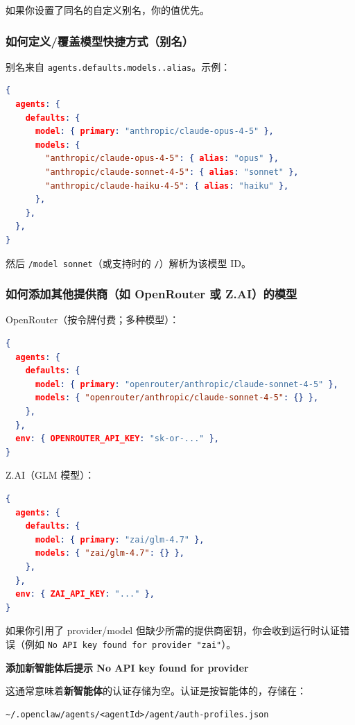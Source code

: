 如果你设置了同名的自定义别名，你的值优先。

\subsubsection{如何定义/覆盖模型快捷方式（别名）}


别名来自 \texttt{agents.defaults.models..alias}。示例：

\begin{lstlisting}[language=json]
{
  agents: {
    defaults: {
      model: { primary: "anthropic/claude-opus-4-5" },
      models: {
        "anthropic/claude-opus-4-5": { alias: "opus" },
        "anthropic/claude-sonnet-4-5": { alias: "sonnet" },
        "anthropic/claude-haiku-4-5": { alias: "haiku" },
      },
    },
  },
}
\end{lstlisting}


然后 \texttt{/model sonnet}（或支持时的 \texttt{/}）解析为该模型 ID。

\subsubsection{如何添加其他提供商（如 OpenRouter 或 Z.AI）的模型}


OpenRouter（按令牌付费；多种模型）：

\begin{lstlisting}[language=json]
{
  agents: {
    defaults: {
      model: { primary: "openrouter/anthropic/claude-sonnet-4-5" },
      models: { "openrouter/anthropic/claude-sonnet-4-5": {} },
    },
  },
  env: { OPENROUTER_API_KEY: "sk-or-..." },
}
\end{lstlisting}


Z.AI（GLM 模型）：

\begin{lstlisting}[language=json]
{
  agents: {
    defaults: {
      model: { primary: "zai/glm-4.7" },
      models: { "zai/glm-4.7": {} },
    },
  },
  env: { ZAI_API_KEY: "..." },
}
\end{lstlisting}


如果你引用了 provider/model 但缺少所需的提供商密钥，你会收到运行时认证错误（例如 \texttt{No API key found for provider "zai"}）。

\textbf{添加新智能体后提示 No API key found for provider}

这通常意味着\textbf{新智能体}的认证存储为空。认证是按智能体的，存储在：

\begin{lstlisting}
~/.openclaw/agents/<agentId>/agent/auth-profiles.json
\end{lstlisting}


